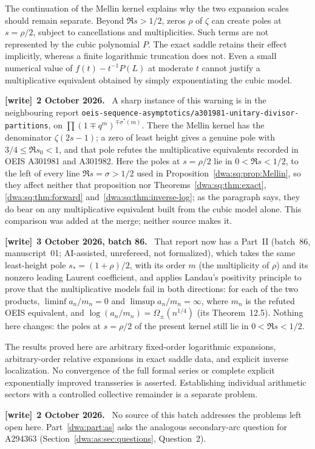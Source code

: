 \documentclass[11pt,letterpaper]{article}
\newcommand{\file}[1]{\nolinkurl{#1}}
\numberwithin{equation}{section}
\theoremstyle{remark}
\newenvironment{writenote}[1][]{\par\smallskip\begingroup\small
 \noindent\textbf{[write]}\if\relax\detokenize{#1}\relax\else~\textbf{#1.}\fi\ }%
 {\par\endgroup\smallskip}
\begin{document}
The continuation of the Mellin kernel explains why the two expansion scales should remain separate. Beyond $\Re s>1/2$, zeros $\rho$ of $\zeta$ can create poles at $s=\rho/2$, subject to cancellations and multiplicities. Such terms are not represented by the cubic polynomial $P$. The exact saddle retains their effect implicitly, whereas a finite logarithmic truncation does not. Even a small numerical value of $f(t)-t^{-1}P(L)$ at moderate $t$ cannot justify a multiplicative equivalent obtained by simply exponentiating the cubic model.
\begin{writenote}[2 October 2026]
A sharp instance of this warning is in the neighbouring report \file{oeis-sequence-asymptotics/a301981-unitary-divisor-partitions}, on $\prod(1\mp q^m)^{\mp\sigma^*(m)}$. There the Mellin kernel has the denominator $\zeta(2s-1)$; a zero of least height gives a genuine pole with $3/4\le\Re s_0<1$, and that pole refutes the multiplicative equivalents recorded in OEIS A301981 and A301982. Here the poles at $s=\rho/2$ lie in $0<\Re s<1/2$, to the left of every line $\Re s=\sigma>1/2$ used in Proposition~\ref{dwa:sq:prop:Mellin}, so they affect neither that proposition nor Theorems~\ref{dwa:sq:thm:exact}, \ref{dwa:sq:thm:forward} and~\ref{dwa:sq:thm:inverse-log}; as the paragraph says, they do bear on any multiplicative equivalent built from the cubic model alone. This comparison was added at the merge; neither source makes it.
\end{writenote}
\begin{writenote}[3 October 2026, batch 86]
That report now has a Part~II (batch~86, manuscript~01; AI-assisted, unrefereed, not formalized), which takes the same least-height pole $s_*=(1+\rho)/2$, with its order $m$ (the multiplicity of $\rho$) and its nonzero leading Laurent coefficient, and applies Landau's positivity principle to prove that the multiplicative models fail in both directions: for each of the two products, $\liminf a_n/m_n=0$ and $\limsup a_n/m_n=\infty$, where $m_n$ is the refuted OEIS equivalent, and $\log(a_n/m_n)=\Omega_\pm(n^{1/4})$ (its Theorem~12.5). Nothing here changes: the poles at $s=\rho/2$ of the present kernel still lie in $0<\Re s<1/2$.
\end{writenote}

The results proved here are arbitrary fixed-order logarithmic expansions, arbitrary-order relative expansions in exact saddle data, and explicit inverse localization. No convergence of the full formal series or complete explicit exponentially improved transseries is asserted. Establishing individual arithmetic sectors with a controlled collective remainder is a separate problem.
\begin{writenote}[2 October 2026]
No source of this batch addresses the problems left open here. Part~\ref{dwa:part:as} asks the analogous secondary-arc question for A294363 (Section~\ref{dwa:as:sec:questions}, Question~2).
\end{writenote}
\end{document}
